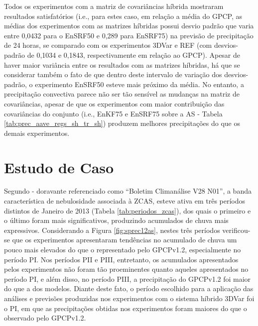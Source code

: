 Todos os experimentos com a matriz de covariâncias híbrida mostraram resultados satisfatórios (i.e., para estes caso, em relação a média do GPCP, as médias dos experimentos com as matrizes híbridas possui desvio padrão que varia entre 0,0432 para o EnSRF50 e 0,289 para EnSRF75) na previsão de precipitação de 24 horas, se comparado com os experimentos 3DVar e REF (com desvios-padrão de 0,1034 e 0,1843, respectivamente em relação ao GPCP). Apesar de haver maior variância entre os resultados com as matrizes híbridas, há que se considerar também o fato de que dentro deste intervalo de variação dos desvios-padrão, o experimento EnSRF50 esteve mais próximo da média. No entanto, a precipitação convectiva parece não ser tão sensível as mudanças na matriz de covariâncias, apesar de que os experimentos com maior contribuição das covariâncias do conjunto (i.e., EnKF75 e EnSRF75 sobre a AS - Tabela \ref{tab:prec_aave_regs_sh_tr_sh}) produzem melhores precipitações do que os demais experimentos.

\section{Estudo de Caso}
\label{sec:estudo_caso}

Segundo  - doravante referenciado como ``Boletim Climanálise V28 N01'', a banda característica de nebulosidade associada à ZCAS, esteve ativa em três períodos distintos de Janeiro de 2013 (Tabela \ref{tab:periodos_zcas}), dos quais o primeiro e o último foram mais significativos, produzindo acumulados de chuva mais expressivos. Considerando a Figura \ref{fig:sprec12as}, nestes três períodos verificou-se que os experimentos apresentaram tendências no acumulado de chuva um pouco mais elevados do que o representado pelo GPCPv1.2, especialmente no período PI. Nos períodos PII e PIII, entretanto, os acumulados apresentados pelos experimentos não foram tão proeminentes quanto aqueles apresentados no período PI, e além disso, no período PIII, a precipitação do GPCPv1.2 foi maior do que a dos modelos. Diante deste fato, o período escolhido para a aplicação das análises e previsões produzidas nos experimentos com o sistema híbrido 3DVar foi o PI, em que as precipitações obtidas nos experimentos foram maiores do que o observado pelo GPCPv1.2.

